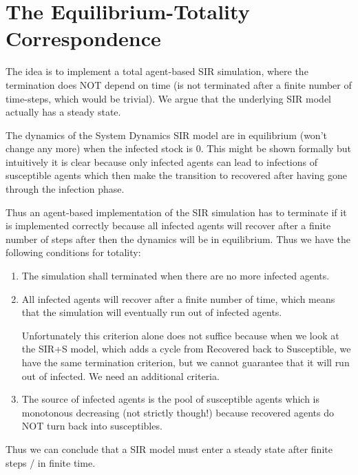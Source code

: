\chapter{The Equilibrium-Totality Correspondence}

The idea is to implement a total agent-based SIR simulation, where the termination does NOT depend on time (is not terminated after a finite number of time-steps, which would be trivial).  We argue that the underlying SIR model actually has a steady state.

The dynamics of the System Dynamics SIR model are in equilibrium (won't change any more) when the infected stock is 0. This might be shown formally but intuitively it is clear because only infected agents can lead to infections of susceptible agents which then make the transition to recovered after having gone through the infection phase. 

Thus an agent-based implementation of the SIR simulation has to terminate if it is implemented correctly because all infected agents will recover after a finite number of steps after then the dynamics will be in equilibrium. Thus we have the following conditions for totality:
\begin{enumerate}
	\item The simulation shall terminated when there are no more infected agents.
	\item All infected agents will recover after a finite number of time, which means that the simulation will eventually run out of infected agents. 
	
	Unfortunately this criterion alone does not suffice because when we look at the SIR+S model, which adds a cycle from Recovered back to Susceptible, we have the same termination criterion, but we cannot guarantee that it will run out of infected. We need an additional criteria.
	\item The source of infected agents is the pool of susceptible agents which is monotonous decreasing (not strictly though!) because recovered agents do NOT turn back into susceptibles.
\end{enumerate}

Thus we can conclude that a SIR model must enter a steady state after finite steps / in finite time. %

